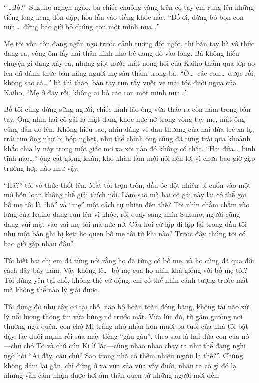 ﻿\documentclass[../main.tex]{subfiles}
\begin{document}
``\dots Bố?'' Suzuno nghẹn ngào, ba chiếc chuông vàng trên cổ tay em rung lên những tiếng leng keng dồn dập, hòa lẫn vào tiếng khóc nấc. ``Bố ơi, đừng bỏ bọn con nữa\dots\ đừng bao giờ bỏ chúng con một mình nữa\dots''

Mẹ tôi vốn còn đang ngẩn ngơ trước cảnh tượng đột ngột, thì bàn tay bà vô thức dang ra, vòng ôm lấy hai thân hình nhỏ bé đang đổ vào lòng. Bà không hiểu chuyện gì đang xảy ra, nhưng giọt nước mắt nóng hổi của Kaiho thấm qua lớp áo len đã đánh thức bản năng người mẹ sâu thẳm trong bà. ``Ồ\dots\ các con\dots\ được rồi, không sao cả\dots'' bà thì thào, bàn tay run rẩy vuốt ve mái tóc đuôi ngựa của Kaiho, ``Mẹ ở đây rồi, không ai bỏ các con một mình nữa\dots''

Bố tôi cũng đứng sững người, chiếc kính lão ông vừa tháo ra còn nằm trong bàn tay. Ông nhìn hai cô gái lạ mặt đang khóc nức nở trong vòng tay mẹ, mắt ông cũng dần đỏ lên. Không hiểu sao, nhìn dáng vẻ đau thương của hai đứa trẻ xa lạ, trái tim ông như bị bóp nghẹt, như thể chính ông cũng đã từng trải qua khoảnh khắc chia ly này trong một giấc mơ xa xôi nào đó không có thật. ``Hai đứa\dots\ bình tĩnh nào\dots'' ông cất giọng khàn, khó khăn lắm mới nói nên lời vì chưa bao giờ gặp trường hợp nào như vậy.

``Hả?'' tôi vô thức thốt lên. Mắt tôi trợn tròn, đầu óc đột nhiên bị cuốn vào một mớ hỗn loạn không thể giải thích nổi. Làm sao mà hai cô gái này lại có thể gọi bố mẹ tôi là ``bố'' và ``mẹ'' một cách tự nhiên đến thế? Tôi nhìn chằm chằm vào lưng của Kaiho đang run lên vì khóc, rồi quay sang nhìn Suzuno, người cũng đang vùi mặt vào vai mẹ tôi mà nức nở. Câu hỏi cứ lặp đi lặp lại trong đầu tôi như một bản ghi bị kẹt: họ quen bố mẹ tôi từ khi nào? Trước đây chúng tôi có bao giờ gặp nhau đâu?

Tôi biết hai chị em đã từng nói rằng họ đã từng có bố mẹ, và họ cũng đã qua đời cách đây bảy năm. Vậy không lẽ\dots\ bố mẹ của họ nhìn khá giống với bố mẹ tôi? Tôi đứng yên tại chỗ, không thể cử động, chỉ có thể nhìn cảnh tượng trước mắt mà không thể nào lý giải được.

Tôi đứng đơ như cây cơ tại chỗ, não bộ hoàn toàn đóng băng, không tài nào xử lý nổi lượng thông tin vừa bùng nổ trước mắt. Vừa lúc đó, từ gầm giường nơi thường ngủ quên, con chó Mi trắng nhỏ nhắn hơn mười ba tuổi của nhà tôi bật dậy, lắc đuôi mạnh rồi sủa mấy tiếng ``gâu gâu'', theo sau là hai đứa con của nó—chú chó Tô và chú cún Ki lí lắc—cũng nhao nhao chạy ra như thể đang nghi ngờ hỏi ``Ai đấy, cậu chủ? Sao trong nhà có thêm nhiều người lạ thế?''. Chúng không dám lại gần, chỉ đứng ở xa vừa sủa vừa vẫy đuôi, nhận ra có gì đó lạ nhưng vẫn cảm nhận được hơi ấm thân quen từ những người mới đến.
\end{document}
